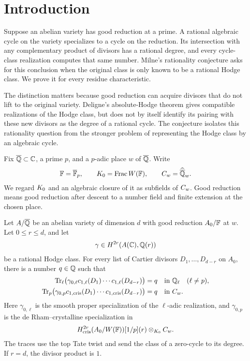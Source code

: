 \section{Introduction}

Suppose an abelian variety has good reduction at a prime. A rational
algebraic cycle on the variety specializes to a cycle on the reduction.
Its intersection with any complementary product of divisors has a rational
degree, and every cycle-class realization computes that same number.
Milne's rationality conjecture asks for this conclusion when the original
class is only known to be a rational Hodge class. We prove it for every
residue characteristic.

The distinction matters because good reduction can acquire divisors that
do not lift to the original variety. Deligne's absolute-Hodge theorem gives
compatible realizations of the Hodge class, but does not by itself identify
its pairing with these new divisors as the degree of a rational cycle.
The conjecture isolates this rationality question from the stronger problem
of representing the Hodge class by an algebraic cycle.

Fix \(\overline{\mathbb Q}\subset\mathbb C\), a prime \(p\), and a \(p\)-adic place \(w\)
of \(\overline{\mathbb Q}\). Write
\[
 \mathbb F=\overline{\mathbb F}_p,\qquad
 K_0=\operatorname{Frac}W(\mathbb F),\qquad
 C_w=\widehat{\overline{\mathbb Q}}_w.
\]
We regard \(K_0\) and an algebraic closure of it as subfields of
\(C_w\). Good reduction means good reduction after descent to a number
field and finite extension at the chosen place.

\begin{theorem}\label{thm:main}
Let \(A/\overline{\mathbb Q}\) be an abelian variety of dimension \(d\) with good
reduction \(A_0/\mathbb F\) at \(w\). Let \(0\leq r\leq d\), and let
\[
 \gamma\in H^{2r}(A(\mathbb C),\mathbb Q(r))
\]
be a rational Hodge class. For every list of Cartier divisors
\(D_1,\ldots,D_{d-r}\) on \(A_0\), there is a number \(q\in\mathbb Q\)
such that
\begin{align*}
 \operatorname{Tr}_\ell\bigl(\gamma_{0,\ell}
       c_{1,\ell}(D_1)\cdots c_{1,\ell}(D_{d-r})\bigr)&=q
       &&\text{in }\mathbb Q_\ell\quad(\ell\ne p),\\
 \operatorname{Tr}_p\bigl(\gamma_{0,p}
       c_{1,\mathrm{cris}}(D_1)\cdots
       c_{1,\mathrm{cris}}(D_{d-r})\bigr)&=q
       &&\text{in }C_w.
\end{align*}
Here \(\gamma_{0,\ell}\) is the smooth proper specialization of the
\(\ell\)-adic realization, and \(\gamma_{0,p}\) is the
de Rham--crystalline specialization in
\[
 H^{2r}_{\mathrm{cris}}(A_0/W(\mathbb F))[1/p](r)
       \otimes_{K_0}C_w.
\]
The traces use the top Tate twist and send the class of a zero-cycle to
its degree. If \(r=d\), the divisor product is \(1\).
\end{theorem}

